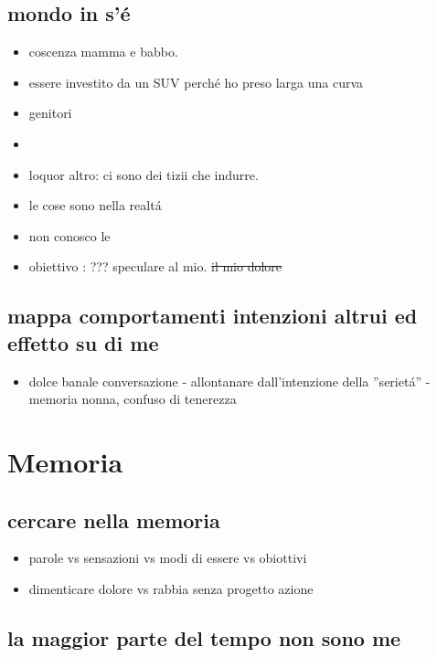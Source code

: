 \subsection{mondo in s'\'e}

\begin{itemize}
\item coscenza mamma e babbo.
\item essere investito da un SUV perch\'e ho preso larga una curva
\item genitori
\item {}
\item loquor altro:
ci sono dei tizii che  indurre.
\item le cose sono nella realt\'a
\item non conosco le 
\item obiettivo : ??? speculare al mio. \sout{il mio dolore}
\end{itemize}

\subsection{mappa comportamenti intenzioni altrui ed effetto su di me}

\begin{itemize}
\item dolce banale conversazione - allontanare dall'intenzione della ''seriet\'a'' - memoria nonna, confuso di tenerezza
\end{itemize}

\section{Memoria}

\subsection{cercare nella memoria}

\begin{itemize}
\item parole vs sensazioni vs modi di essere vs obiottivi
\item dimenticare dolore vs rabbia senza progetto azione 
\end{itemize}

\subsection{la maggior parte del tempo non sono me}


